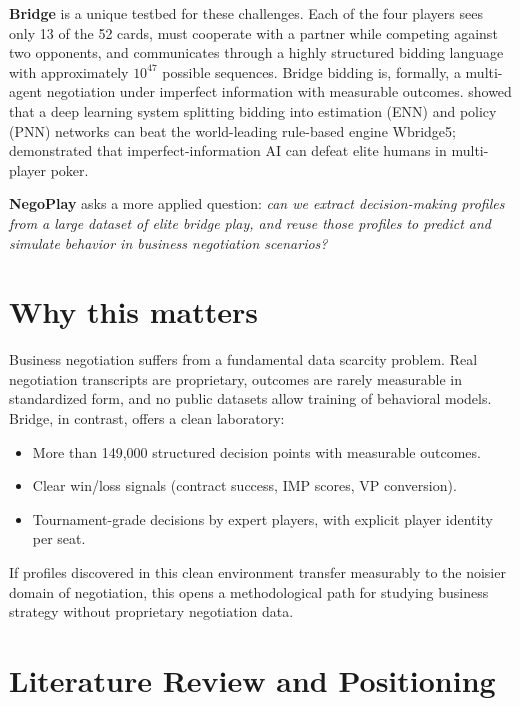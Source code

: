 \documentclass[11pt, a4paper, oneside, openany]{report}
\begin{document}
\textbf{Bridge} is a unique testbed for these challenges. Each of the four players sees only 13 of the 52 cards, must cooperate with a partner while competing against two opponents, and communicates through a highly structured bidding language with approximately $10^{47}$ possible sequences. Bridge bidding is, formally, a multi-agent negotiation under imperfect information with measurable outcomes. \citet{rong2019competitive} showed that a deep learning system splitting bidding into estimation (ENN) and policy (PNN) networks can beat the world-leading rule-based engine Wbridge5; \citet{brown2019pluribus} demonstrated that imperfect-information AI can defeat elite humans in multi-player poker.

\textbf{NegoPlay} asks a more applied question: \emph{can we extract decision-making profiles from a large dataset of elite bridge play, and reuse those profiles to predict and simulate behavior in business negotiation scenarios?}

\section{Why this matters}

Business negotiation suffers from a fundamental data scarcity problem. Real negotiation transcripts are proprietary, outcomes are rarely measurable in standardized form, and no public datasets allow training of behavioral models. Bridge, in contrast, offers a clean laboratory:

\begin{itemize}[leftmargin=*]
    \item More than 149{,}000 structured decision points with measurable outcomes.
    \item Clear win/loss signals (contract success, IMP scores, VP conversion).
    \item Tournament-grade decisions by expert players, with explicit player identity per seat.
\end{itemize}

If profiles discovered in this clean environment transfer measurably to the noisier domain of negotiation, this opens a methodological path for studying business strategy without proprietary negotiation data.

\section{Literature Review and Positioning}
\label{sec:litreview}
\end{document}
